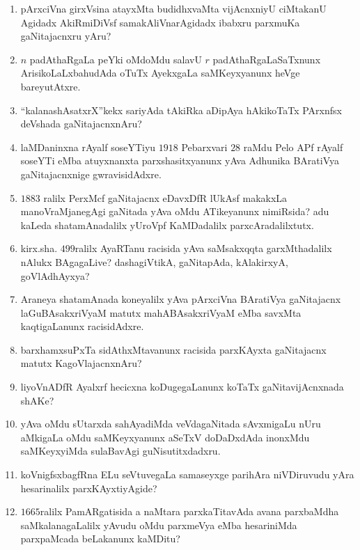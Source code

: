 \begin{enumerate}
\item pArxciVna girxVsina atayxMta budidhxvaMta vijAcnxniyU ciMtakanU Agidadx AkiRmiDiVsf samakAliVnarAgidadx  ibabxru parxmuKa gaNitajacnxru yAru?
  
\item $n$ padAthaRgaLa peYki oMdoMdu salavU $r$ padAthaRgaLaSaTxnunx ArisikoLaLxbahudAda oTuTx AyekxgaLa saMKeyxyanunx heVge bareyutAtxre. 
  
\item ``kalanashAsatxrX''kekx sariyAda tAkiRka aDipAya hAkikoTaTx PArxnfsx deVshada gaNitajacnxnAru?

\item laMDaninxna rAyalf soseYTiyu $1918$ Pebarxvari $28$ raMdu Pelo APf rAyalf soseYTi eMba atuyxnanxta parxshasitxyanunx yAva Adhunika BAratiVya gaNitajacnxnige gwravisidAdxre.

\item $1883$ ralilx PerxMcf gaNitajacnx eDavxDfR lUkAsf makakxLa manoVraMjanegAgi gaNitada yAva oMdu ATikeyanunx nimiRsida? adu kaLeda shatamAnadalilx yUroVpf KaMDadalilx parxcAradalilxtutx.
  
\item kirx.sha. $499$ralilx AyaRTanu racisida yAva saMsakxqqta garxMthadalilx nAlukx BAgagaLive? dashagiVtikA, gaNitapAda, kAlakirxyA, goVlAdhAyxya?
  
\item Araneya shatamAnada koneyalilx yAva pArxciVna BAratiVya gaNitajacnx laGuBAsakxriVyaM matutx mahABAsakxriVyaM eMba savxMta kaqtigaLanunx racisidAdxre. 
  
\item barxhamxsuPxTa sidAthxMtavanunx racisida parxKAyxta gaNitajacnx matutx KagoVlajacnxnAru?
  
\item liyoVnADfR Ayalxrf hecicxna koDugegaLanunx koTaTx gaNitavijAcnxnada shAKe?
  
\item yAva oMdu sUtarxda sahAyadiMda veVdagaNitada sAvxmigaLu nUru aMkigaLa oMdu saMKeyxyanunx aSeTxV doDaDxdAda inonxMdu saMKeyxyiMda sulaBavAgi guNisutitxdadxru.
  
\item koVnigfsxbagfRna ELu seVtuvegaLa samaseyxge parihAra niVDiruvudu yAra hesarinalilx parxKAyxtiyAgide?

\item $1665$ralilx PamARgatisida a naMtara parxkaTitavAda avana parxbaMdha saMkalanagaLalilx yAvudu oMdu parxmeVya eMba hesariniMda parxpaMcada beLakanunx kaMDitu?


\end{enumerate}
